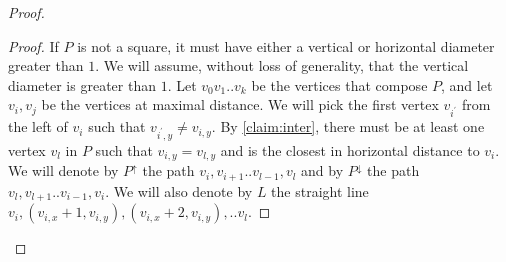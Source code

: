 \documentclass[12pt,a4paper]{article}
\begin{document}
\begin{proof}
  \begin{proof} 
%
If $P$ is not a square, it must have either a vertical or horizontal diameter greater than $1$. We will assume, without loss of generality, that the vertical diameter is greater than $1$. Let $v_{0}v_{1}..v_{k}$ be the vertices that compose $P$, and let $v_{i},v_{j}$ be the vertices at maximal distance. We will pick the first vertex $v_{i^\prime}$ from the left of $v_{i}$ such that $v_{i^\prime , y} \neq v_{i,y}$. By \cref{claim:inter}, there must be at least one vertex $v_{l}$ in $P$ such that $v_{i,y} = v_{l,y}$ and is the closest in horizontal distance to $v_{i}$. We will denote by $P^{\uparrow}$ the path $v_{i},v_{i+1}..v_{l-1},v_{l}$ and by $P^{\downarrow}$ the path $v_{l},v_{l+1}..v_{i-1},v_{i}$. We will also denote by $L$ the straight line $v_{i},\left( v_{i,x}+1, v_{i,y} \right), \left( v_{i,x}+2, v_{i,y} \right), .. v_{l}$. 


\end{proof}
\end{proof}
\end{document}
